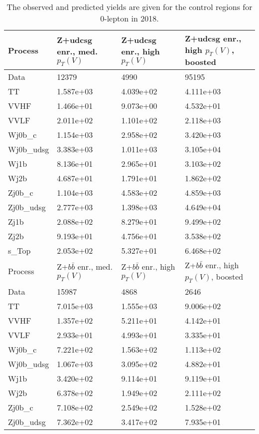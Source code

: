 \begin{table}
\centering
\caption[2018 0-lepton control region yields]{
                  The observed and predicted yields are given for the
                  control regions for 0-lepton in 2018.
                  }
{\footnotesize
\begin{tabularx}{0.8\textwidth}{|X|X|X|X|}
\hline
Process & Z+udcsg enr., med. $p_{T}(V)$ & Z+udcsg enr., high $p_{T}(V)$ & Z+udcsg enr., high $p_{T}(V)$, boosted \\
\hline
Data & 12379 & 4990 & 95195 \\
\hline
TT & 1.587e+03 & 4.039e+02 & 4.111e+03 \\
VVHF & 1.466e+01 & 9.073e+00 & 4.532e+01 \\
VVLF & 2.011e+02 & 1.101e+02 & 2.118e+03 \\
Wj0b\_c & 1.154e+03 & 2.958e+02 & 3.420e+03 \\
Wj0b\_udsg & 3.383e+03 & 1.011e+03 & 3.105e+04 \\
Wj1b & 8.136e+01 & 2.965e+01 & 3.103e+02 \\
Wj2b & 4.687e+01 & 1.791e+01 & 1.862e+02 \\
Zj0b\_c & 1.104e+03 & 4.583e+02 & 4.859e+03 \\
Zj0b\_udsg & 2.777e+03 & 1.398e+03 & 4.649e+04 \\
Zj1b & 2.088e+02 & 8.279e+01 & 9.499e+02 \\
Zj2b & 9.193e+01 & 4.756e+01 & 3.538e+02 \\
s\_Top & 2.053e+02 & 5.327e+01 & 6.468e+02 \\
\hline
\hline
Process & Z+$b\bar{b}$ enr., med. $p_{T}(V)$ & Z+$b\bar{b}$ enr., high $p_{T}(V)$ & Z+$b\bar{b}$ enr., high $p_{T}(V)$, boosted \\
\hline
Data & 15987 & 4868 & 2646 \\
\hline
TT & 7.015e+03 & 1.555e+03 & 9.006e+02 \\
VVHF & 1.357e+02 & 5.211e+01 & 4.142e+01 \\
VVLF & 2.933e+01 & 4.993e+01 & 3.335e+01 \\
Wj0b\_c & 7.221e+02 & 1.563e+02 & 1.113e+02 \\
Wj0b\_udsg & 1.067e+03 & 3.095e+02 & 4.882e+01 \\
Wj1b & 3.420e+02 & 9.114e+01 & 9.119e+01 \\
Wj2b & 6.378e+02 & 1.949e+02 & 2.111e+02 \\
Zj0b\_c & 7.108e+02 & 2.549e+02 & 1.528e+02 \\
Zj0b\_udsg & 7.362e+02 & 3.417e+02 & 7.935e+01 \\

\end{tabularx}}
\end{table}
